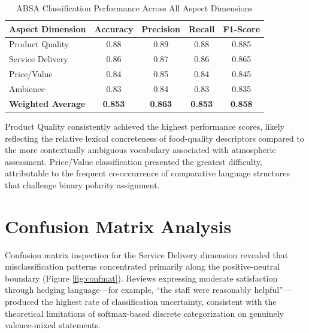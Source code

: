 \documentclass[12pt,a4paper]{report}
\begin{document}
\begin{table}[H]
\centering
\caption{ABSA Classification Performance Across All Aspect Dimensions}
\label{tab:classification}
\begin{tabular}{@{}lcccc@{}}
\toprule
\textbf{Aspect Dimension} & \textbf{Accuracy} & \textbf{Precision} & \textbf{Recall} & \textbf{F1-Score} \\
\midrule
Product Quality   & 0.88 & 0.89 & 0.88 & 0.885 \\
Service Delivery  & 0.86 & 0.87 & 0.86 & 0.865 \\
Price/Value       & 0.84 & 0.85 & 0.84 & 0.845 \\
Ambience          & 0.83 & 0.84 & 0.83 & 0.835 \\
\midrule
\textbf{Weighted Average} & \textbf{0.853} & \textbf{0.863} & \textbf{0.853} & \textbf{0.858} \\
\bottomrule
\end{tabular}
\end{table}

Product Quality consistently achieved the highest performance scores, likely reflecting the relative lexical concreteness of food-quality descriptors compared to the more contextually ambiguous vocabulary associated with atmospheric assessment. Price/Value classification presented the greatest difficulty, attributable to the frequent co-occurrence of comparative language structures that challenge binary polarity assignment.

\section{Confusion Matrix Analysis}
Confusion matrix inspection for the Service Delivery dimension revealed that misclassification patterns concentrated primarily along the positive-neutral boundary (Figure \ref{fig:confmat}). Reviews expressing moderate satisfaction through hedging language—for example, ``the staff were reasonably helpful''—produced the highest rate of classification uncertainty, consistent with the theoretical limitations of softmax-based discrete categorization on genuinely valence-mixed statements.
\end{document}
